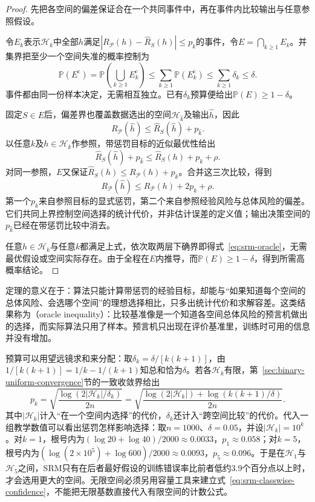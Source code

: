 \begin{proof}
先把各空间的偏差保证合在一个共同事件中，再在事件内比较输出与任意参照假设。

令$E_k$表示$\mathcal H_k$中全部$h$满足$|R_{\mathcal P}(h)-\hat R_S(h)|\leq p_k$的事件，令$E=\bigcap_{k\geq1}E_k$。并集界把至少一个空间失准的概率控制为
\[
 \mathbb P(E^{\mathrm c})
 =\mathbb P\left(\bigcup_{k\geq1}E_k^{\mathrm c}\right)
 \leq\sum_{k\geq1}\mathbb P(E_k^{\mathrm c})
 \leq\sum_{k\geq1}\delta_k\leq\delta.
\]
事件都由同一份样本决定，无需相互独立。已有$\delta_k$预算便给出$\mathbb P(E)\geq1-\delta$。

固定$S\in E$后，偏差界也覆盖数据选出的空间$\mathcal H_{\hat k}$及输出$\hat h$，因此
\[
 R_{\mathcal P}(\hat h)\leq\hat R_S(\hat h)+p_{\hat k}.
\]
以任意$k$及$h\in\mathcal H_k$作参照，带惩罚目标的近似最优性给出
\[
 \hat R_S(\hat h)+p_{\hat k}
 \leq\hat R_S(h)+p_k+\rho.
\]
对同一参照，$E$又保证$\hat R_S(h)\leq R_{\mathcal P}(h)+p_k$。合并这三次比较，得到
\[
 R_{\mathcal P}(\hat h)
 \leq R_{\mathcal P}(h)+2p_k+\rho.
\]
第一个$p_k$来自参照目标的显式惩罚，第二个来自参照经验风险与总体风险的偏差。它们共同上界控制空间选择的统计代价，并非估计误差的定义值；输出决策空间的$p_{\hat k}$已经在带惩罚比较中消去。

任意$h\in\mathcal H_k$与任意$k$都满足上式，依次取两层下确界即得式~\eqref{eq:srm-oracle}，无需最优假设或空间实际存在。由于全程在$E$内推导，而$\mathbb P(E)\geq1-\delta$，得到所需高概率结论。
\end{proof}

定理的意义在于：算法只能计算带惩罚的经验目标，却能与“如果知道每个空间的总体风险、会选哪个空间”的理想选择相比，只多出统计代价和求解容差。这类结果称为（oracle inequality）：比较基准像是一个知道各空间总体风险的预言机做出的选择，而实际算法只用了样本。预言机只出现在评价基准里，训练时可用的信息并没有增加。

预算可以用望远镜求和来分配：取$\delta_k=\delta/[k(k+1)]$，由$1/[k(k+1)]=1/k-1/(k+1)$知总和恰为$\delta$。若各$\mathcal H_k$有限，第~\ref{sec:binary-uniform-convergence}节的一致收敛界给出
\[
 p_k=\sqrt{\frac{\log(2|\mathcal H_k|/\delta_k)}{2n}}
 =\sqrt{\frac{\log(2|\mathcal H_k|)+\log(k(k+1)/\delta)}{2n}}.
\]
其中$|\mathcal H_k|$计入“在一个空间内选择”的代价，$\delta_k$还计入“跨空间比较”的代价。代入一组教学数值可以看出惩罚怎样影响选择：取$n=1000$、$\delta=0.05$，并设$|\mathcal H_k|=10^k$。对$k=1$，根号内为$(\log20+\log40)/2000\approx0.0033$，$p_1\approx0.058$；对$k=5$，根号内为$(\log(2\times10^5)+\log600)/2000\approx0.0093$，$p_5\approx0.096$。于是在$\mathcal H_1$与$\mathcal H_5$之间，SRM只有在后者最好假设的训练错误率比前者低约3.9个百分点以上时，才会选用更大的空间。无限空间必须另用容量工具来建立式~\eqref{eq:srm-classwise-confidence}，不能把无限基数直接代入有限空间的计数公式。

